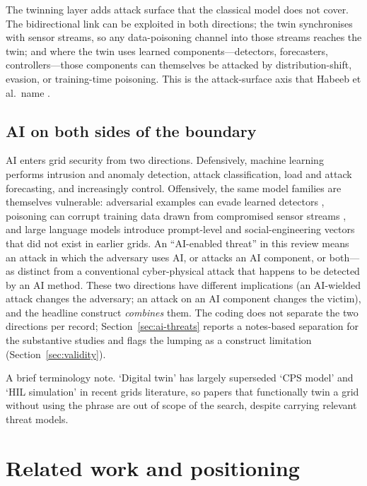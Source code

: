 \documentclass[preprint,12pt]{elsarticle}
\renewcommand{\_}{\plainunderscore\allowbreak}
\begin{document}
The twinning layer adds attack surface that the classical model does not cover. The
bidirectional link can be exploited in both directions; the twin synchronises with sensor
streams, so any data-poisoning channel into those streams reaches the twin; and where the twin
uses learned components---detectors, forecasters, controllers---those components can themselves
be attacked by distribution-shift, evasion, or training-time poisoning. This is the attack-surface
axis that Habeeb et al.\ name \cite{habeeb2026}.

\subsection{AI on both sides of the boundary}

AI enters grid security from two directions. Defensively, machine learning performs intrusion
and anomaly detection, attack classification, load and attack forecasting, and increasingly
control. Offensively, the same model families are themselves vulnerable: adversarial examples
can evade learned detectors \cite{szegedy2014,goodfellow2015}, poisoning can corrupt training
data drawn from compromised sensor streams \cite{biggio2018}, and large language models
introduce prompt-level and social-engineering vectors that
did not exist in earlier grids. An ``AI-enabled threat'' in this review means an attack in which
the adversary uses AI, or attacks an AI component, or both---as distinct from a conventional
cyber-physical attack that happens to be detected by an AI method. These two directions have
different implications (an AI-wielded attack changes the adversary; an attack on an AI
component changes the victim), and the headline construct \emph{combines} them. The coding
does not separate the two directions per record; Section~\ref{sec:ai-threats} reports a
notes-based separation for the substantive studies and flags the lumping as a construct
limitation (Section~\ref{sec:validity}).

A brief terminology note. `Digital twin' has largely superseded `CPS model' and `HIL simulation'
in recent grids literature, so papers that functionally twin a grid without using the phrase are
out of scope of the search, despite carrying relevant threat models.

\section{Related work and positioning}\label{sec:related}
\end{document}
